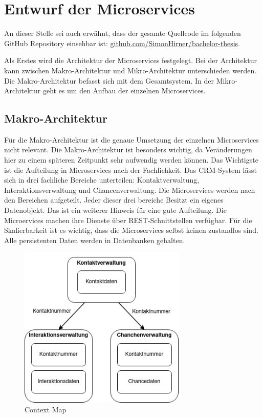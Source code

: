 \clearpage
\section{Entwurf der Microservices}

An dieser Stelle sei auch erwähnt, dass der gesamte Quellcode im folgenden GitHub Repository einsehbar ist: \href{https://github.com/SimonHirner/bachelor-thesis}{github.com/SimonHirner/bachelor-thesis}.

Als Erstes wird die Architektur der Microservices festgelegt. Bei der Architektur kann zwischen Makro-Architektur und Mikro-Architektur unterschieden werden. Die Makro-Architektur befasst sich mit dem Gesamtsystem. In der Mikro-Architektur geht es um den Aufbau der einzelnen Microservices.

\subsection{Makro-Architektur}

Für die Makro-Architektur ist die genaue Umsetzung der einzelnen Microservices nicht relevant. Die Makro-Architektur ist besonders wichtig, da Veränderungen hier zu einem späteren Zeitpunkt sehr aufwendig werden können. Das Wichtigste ist die Aufteilung in Microservices nach der Fachlichkeit. Das CRM-System lässt sich in drei fachliche Bereiche unterteilen: Kontaktverwaltung, Interaktionsverwaltung und Chancenverwaltung. Die Microservices werden nach den Bereichen aufgeteilt. Jeder dieser drei bereiche Besitzt ein eigenes Datenobjekt. Das  ist ein weiterer Hinweis für eine gute Aufteilung. Die Microervices machen ihre Dienste über REST-Schnittstellen verfügbar. Für die Skalierbarkeit ist es wichtig, dass die Microservices selbst keinen zustandlos sind. Alle persistenten Daten werden in Datenbanken gehalten.

\begin{figure}[H] 
    \centering
    \includegraphics[width=0.71\textwidth]{figures/ContextMap.png}
    \caption{Context Map}
    \label{fig:CRMENTWURF}
\end{figure}

